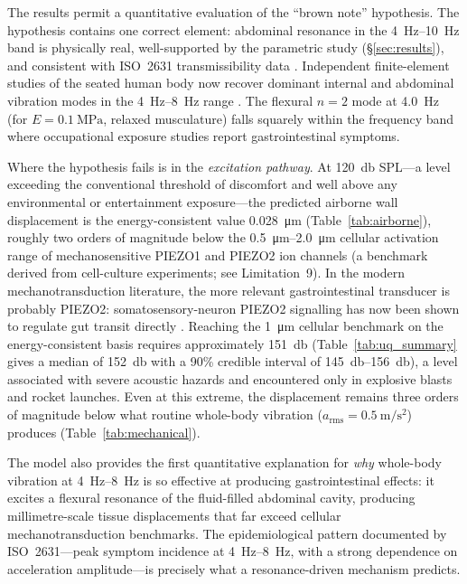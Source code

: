 The results permit a quantitative evaluation of the ``brown note''
hypothesis.  The hypothesis contains one correct element: abdominal resonance in the
\SIrange{4}{10}{\hertz} band is physically real, well-supported by the
parametric study (\S\ref{sec:results}), and consistent with ISO~2631
transmissibility data \cite{iso2631,Kitazaki1998}.  Independent
finite-element studies of the seated human body now recover dominant internal
and abdominal vibration modes in the \SIrange{4}{8}{\hertz} range
\cite{Dong2024}.  The flexural
$n = 2$ mode at \SI{4.0}{\hertz} (for $E = \SI{0.1}{\mega\pascal}$, relaxed
musculature) falls squarely within the frequency band where occupational
exposure studies report gastrointestinal symptoms.

Where the hypothesis fails is in the \emph{excitation pathway}.  At
\SI{120}{\decibel} SPL---a level exceeding the conventional threshold of
discomfort and well above any
environmental or entertainment exposure---the predicted airborne wall
displacement is the energy-consistent value
\SI{0.028}{\micro\metre} (Table~\ref{tab:airborne}), roughly
two orders of magnitude below the \SIrange{0.5}{2.0}{\micro\metre} cellular
activation range of mechanosensitive PIEZO1 and PIEZO2 ion channels
\cite{coste2010piezo1,Lewis2015,Xiao2024} (a benchmark derived from
cell-culture experiments; see Limitation~9).  In the modern mechanotransduction
literature, the more relevant gastrointestinal transducer is probably PIEZO2:
somatosensory-neuron PIEZO2 signalling has now been shown to regulate gut
transit directly \cite{ServinVences2023}.  Reaching the \SI{1}{\micro\metre}
cellular benchmark on the energy-consistent basis requires approximately
\SI{151}{\decibel} (Table~\ref{tab:uq_summary} gives a median of
\SI{152}{\decibel} with a 90\% credible interval of
\SIrange{145}{156}{\decibel}),
a level associated with severe acoustic hazards and encountered only in
explosive blasts and rocket launches.  Even at
this extreme, the displacement remains three
orders of magnitude below what routine whole-body vibration
($a_{\mathrm{rms}} = \SI{0.5}{\metre\per\second\squared}$) produces
(Table~\ref{tab:mechanical}).

The model also provides the first quantitative explanation for \emph{why}
whole-body vibration at \SIrange{4}{8}{\hertz} is so effective at producing
gastrointestinal effects: it excites a flexural resonance of the
fluid-filled abdominal cavity, producing millimetre-scale tissue
displacements that far exceed cellular mechanotransduction benchmarks.  The
epidemiological pattern documented by ISO~2631---peak symptom incidence at
\SIrange{4}{8}{\hertz}, with a strong dependence on acceleration
amplitude---is precisely what a resonance-driven mechanism predicts.

